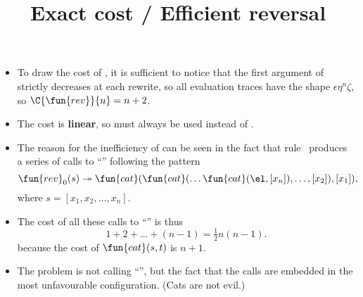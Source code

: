 \documentclass[wide]{slides}
\begin{document}
\begin{slide}
  \title{Exact cost / Efficient reversal}

  \begin{itemize}

    \item To draw the cost of , it is sufficient to notice
      that the first argument of  strictly decreases at each
      rewrite, so all evaluation traces have the shape
      \(\epsilon\eta^n\zeta\), so \(\C{\fun{rev}}{n} = n + 2\).

    \item The cost is \textbf{linear}, so  must always be
      used instead of .

    \item The reason for the inefficiency of  can be
      seen in the fact that rule~\clause{\delta} produces a series of
      calls to ``'' following the
      pattern
      \begin{equation*}
        \fun{rev}_0(s) \twoheadrightarrow \fun{cat}(\fun{cat}(\dots
        \fun{cat}(\el, [x_n]), \dots, [x_2]), [x_1]),
      \end{equation*}
      where \(s = [x_1, x_2, \dots, x_n]\).

    \item The cost of all these calls to ``'' is thus
      \begin{equation*}
        1 + 2 + \dots + (n-1) = \tfrac{1}{2}n(n-1).
      \end{equation*}
      because the cost of \(\fun{cat}(s,t)\) is \(n+1\).

    \item The problem is not calling ``'', but the fact that
      the calls are embedded in the most unfavourable configuration.
      (Cats are not evil.)

  \end{itemize}

\end{slide}
\end{document}
